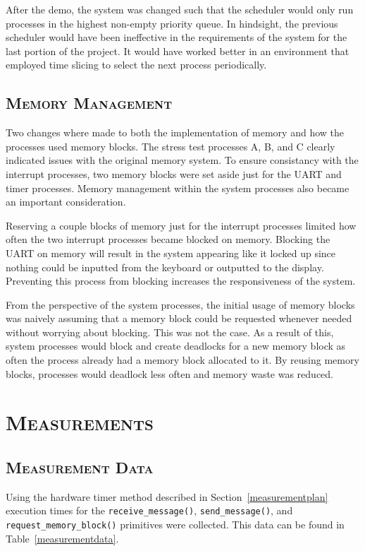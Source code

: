 \documentclass[oneside]{report}
\begin{document}
After the demo, the system was changed such that the scheduler would only run
processes in the highest non-empty priority queue. In hindsight, the previous
scheduler would have been ineffective in the requirements of the system for the
last portion of the project. It would have worked better in an environment that
employed time slicing to select the next process periodically.

\section{\textsc{Memory Management}}
Two changes where made to both the implementation of memory and how the
processes used memory blocks. The stress test processes A, B, and C clearly
indicated issues with the original memory system. To ensure consistancy with
the interrupt processes, two memory blocks were set aside just for the UART and
timer processes. Memory management within the system processes also became an
important consideration.

Reserving a couple blocks of memory just for the interrupt processes limited
how often the two interrupt processes became blocked on memory. Blocking the
UART on memory will result in the system appearing like it locked up since
nothing could be inputted from the keyboard or outputted to the display.
Preventing this process from blocking increases the responsiveness of the
system.

From the perspective of the system processes, the initial usage of memory blocks was
naively assuming that a memory block could be requested whenever needed without
worrying about blocking. This was not the case. As a result of this, system processes
would block and create deadlocks for a new memory block as often the process
already had a memory block allocated to it. By reusing memory blocks, processes
would deadlock less often and memory waste was reduced.

\chapter{\textsc{Measurements}}

\section{\textsc{Measurement Data}}

Using the hardware timer method described in
Section~\ref{measurementplan} execution times for the
\texttt{receive\_message()}, \texttt{send\_message()}, and
\texttt{request\_memory\_block()} primitives were collected. This data
can be found in Table~\ref{measurementdata}.
\end{document}
